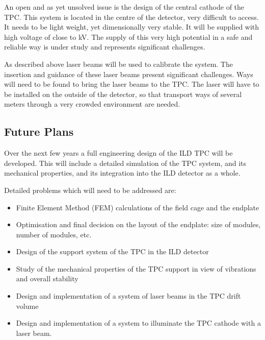An open and as yet unsolved issue is the design of the central cathode of the TPC. This system is located in the centre of the detector, very difficult to access. It needs to be light weight, yet dimensionally very stable. It will be supplied with high voltage of close to \unit[100]{kV}. The supply of this very high potential in a safe and reliable way is under study and represents significant challenges.

As described above laser beams will be used to calibrate the system. The insertion and guidance of these laser beams present significant challenges. Ways will need to be found to bring the laser beams to the TPC. The laser will have to be installed on the outside of the detector, so that transport ways of several meters through a very crowded environment are needed.

\subsection{Future Plans}
Over the next few years a full engineering design of the ILD TPC will be developed. This will include a detailed simulation of the TPC system, and its mechanical properties, and its integration into the ILD detector as a whole.

Detailed problems which will need to be addressed are:

\begin{itemize}
\item Finite Element Method (FEM) calculations of the field cage and the endplate
\item Optimisation and final decision on the layout of the endplate: size of modules, number of modules, etc.
\item Design of the support system of the TPC in the ILD detector
\item Study of the mechanical properties of the TPC support in view of vibrations and overall stability
\item Design and implementation of a system of laser beams in the TPC drift volume
\item Design and implementation of a system to illuminate the TPC cathode with a laser beam.
\end{itemize}



